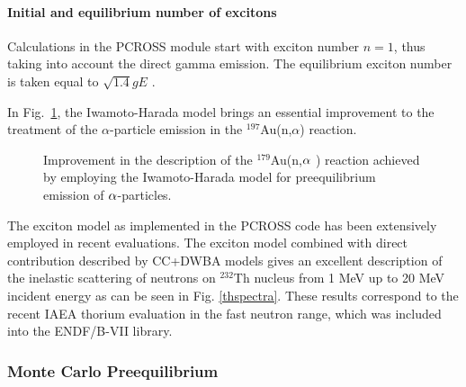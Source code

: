 \paragraph{Initial and equilibrium number of excitons}

Calculations in the PCROSS module start with exciton number $n=1$, thus
taking into account the direct gamma emission. The equilibrium exciton
number is taken equal to $\sqrt{1.4}gE$ \cite{za88,za89}.

\bigskip In Fig.~\ref{goldna}, the Iwamoto-Harada model brings an essential
improvement to the treatment of the $\alpha $-particle emission in the $%
^{197}$Au(n,$\alpha $) reaction. 
\begin{figure}[tbph]
\caption{Improvement in the description of the $^{179}$Au(n,$\protect\alpha $%
) reaction achieved by employing the Iwamoto-Harada model for preequilibrium
emission of $\protect\alpha $-particles.}
\label{goldna}
\end{figure}
The exciton model as implemented in the PCROSS code has been extensively
employed in recent evaluations. The exciton model combined with direct
contribution described by CC+DWBA models gives an excellent description of
the inelastic scattering of neutrons on $^{232}$Th nucleus from 1 MeV up to
20 MeV incident energy as can be seen in Fig. \ref{thspectra}. These results
correspond to the recent IAEA thorium evaluation in the fast neutron range,
which was included into the ENDF/B-VII library.


\subsubsection{Monte Carlo Preequilibrium\label{DDHMS}}

